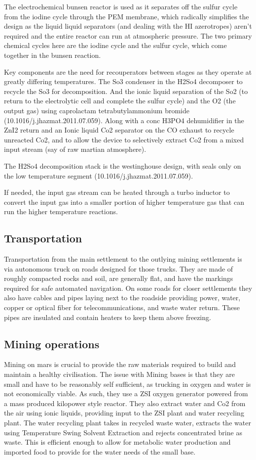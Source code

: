 \documentclass[10pt]{article}
\begin{document}
The electrochemical bunsen reactor is used as it separates off the sulfur cycle from the iodine cycle through the PEM membrane, which radically simplifies the design as the liquid liquid separators (and dealing with the HI azerotropes) aren't required and the entire reactor can run at atmospheric pressure. The two primary chemical cycles here are the iodine cycle and the sulfur cycle, which come together in the bunsen reaction.

Key components are the need for recouperators between stages as they operate at greatly differing temperatures. The So3 condenser in the H2So4 decomposer to recycle the So3 for decomposition. And the ionic liquid separation of the So2 (to return to the electrolytic cell and complete the sulfur cycle) and the O2 (the output gas) using caprolactam tetrabutylammonium bromide (10.1016/j.jhazmat.2011.07.059). Along with a conc H3PO4 dehumidifier in the ZnI2 return and an Ionic liquid Co2 separator on the CO exhaust to recycle unreacted Co2, and to allow the device to selectively extract Co2 from a mixed input stream (say of raw martian atmosphere).

The H2So4 decomposition stack is the westinghouse design, with seals only on the low temperature segment (10.1016/j.jhazmat.2011.07.059).

If needed, the input gas stream can be heated through a turbo inductor to convert the input gas into a smaller portion of higher temperature gas that can run the higher temperature reactions.

\subsection{Transportation}
Transportation from the main settlement to the outlying mining settlements is via autonomous truck on roads designed for those trucks. They are made of roughly compacted rocks and soil, are generally flat, and have the markings required for safe automated navigation. On some roads for closer settlements they also have cables and pipes laying next to the roadside providing power, water, copper or optical fiber for telecommunications, and waste water return. These pipes are insulated and contain heaters to keep them above freezing. 

\subsection{Mining operations}
Mining on mars is crucial to provide the raw materials required to build and maintain a healthy civilisation. The issue with Mining bases is that they are small and have to be reasonably self sufficient, as trucking in oxygen and water is not economically viable. As such, they use a ZSI oxygen generator powered from a mass produced kilopower style reactor. They also extract water and Co2 from the air using ionic liquids, providing input to the ZSI plant and water recycling plant. The water recycling plant takes in recycled waste water, extracts the water using Temperature Swing Solvent Extraction and rejects concentrated brine as waste. This is efficient enough to allow for metabolic water production and imported food to provide for the water needs of the small base.
\end{document}
